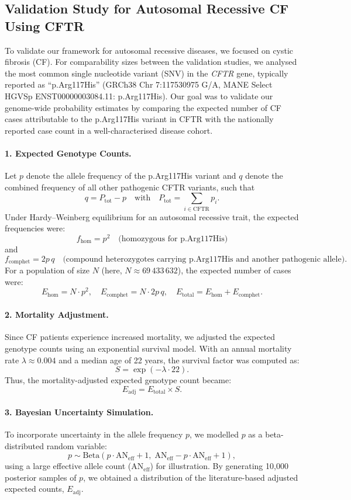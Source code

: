 \subsection{Validation Study for Autosomal Recessive CF Using CFTR}

To validate our framework for autosomal recessive diseases, we focused on cystic fibrosis (CF).
For comparability sizes between the validation studies, we analysed the most common single nucleotide variant (SNV) in the \textit{CFTR} gene, typically reported as ``p.Arg117His'' (GRCh38 Chr 7:117530975 G/A, MANE Select HGVSp ENST00000003084.11: p.Arg117His).
Our goal was to validate our genome-wide probability estimates by comparing the expected number of CF cases attributable to the p.Arg117His variant in CFTR with the nationally reported case count in a well-characterised disease cohort.

\paragraph{1. Expected Genotype Counts.}
Let \( p \) denote the allele frequency of the p.Arg117His variant and \( q \) denote the combined frequency of all other pathogenic CFTR variants, such that
\[
q = P_{\text{tot}} - p \quad \text{with} \quad P_{\text{tot}} = \sum_{i \in \text{CFTR}} p_i.
\]
Under Hardy–Weinberg equilibrium for an autosomal recessive trait, the expected frequencies were:
\[
f_{\text{hom}} = p^2 \quad \text{(homozygous for p.Arg117His)}
\]
and
\[
f_{\text{comphet}} = 2p\,q \quad \text{(compound heterozygotes carrying p.Arg117His and another pathogenic allele)}.
\]
For a population of size \( N \) (here, \( N \approx 69\,433\,632 \)), the expected number of cases were:
\[
E_{\text{hom}} = N \cdot p^2,\quad E_{\text{comphet}} = N \cdot 2p\,q,\quad E_{\text{total}} = E_{\text{hom}} + E_{\text{comphet}}.
\]

\paragraph{2. Mortality Adjustment.}
Since CF patients experience increased mortality, we adjusted the expected genotype counts using an exponential survival model. With an annual mortality rate \(\lambda \approx 0.004\) and a median age of 22 years, the survival factor was computed as:
\[
S = \exp(-\lambda \cdot 22).
\]
Thus, the mortality-adjusted expected genotype count became:
\[
E_{\text{adj}} = E_{\text{total}} \times S.
\]

\paragraph{3. Bayesian Uncertainty Simulation.}
To incorporate uncertainty in the allele frequency \( p \), we modelled \( p \) as a beta-distributed random variable:
\[
p \sim \mathrm{Beta}(p \cdot \text{AN}_{\text{eff}} + 1,\; \text{AN}_{\text{eff}} - p \cdot \text{AN}_{\text{eff}} + 1),
\]
using a large effective allele count (\(\text{AN}_{\text{eff}}\)) for illustration. By generating 10,000 posterior samples of \( p \), we obtained a distribution of the literature-based adjusted expected counts, \(E_{\text{adj}}\).

